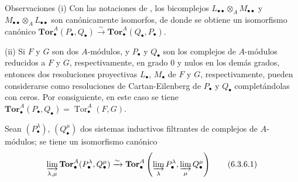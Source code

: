\begin{namedtheorem}[6.3.5]{Observaciones}
\label{III.6.3.5}
(i) Con las notaciones de , los bicomplejos
$L_{\bullet\bullet}\otimes_A M_{\bullet\bullet}$ y
$M_{\bullet\bullet}\otimes_A L_{\bullet\bullet}$ son canónicamente
isomorfos, de donde se obtiene un isomorfismo canónico
$\mathbf{Tor}_\bullet^A(P_\bullet,Q_\bullet)\xrightarrow{\sim}
\mathbf{Tor}_\bullet^A(Q_\bullet,P_\bullet)$.

(ii) Si $F$ y $G$ son dos $A$-módulos, y $P_\bullet$ y $Q_\bullet$ son los
complejos de $A$-módulos reducidos a $F$ y $G$, respectivamente, en grado 0 y
nulos en los demás grados, entonces dos resoluciones proyectivas $L_\bullet$,
$M_\bullet$ de $F$ y $G$, respectivamente, pueden considerarse como
resoluciones de Cartan-Eilenberg de $P_\bullet$ y $Q_\bullet$ completándolas
con ceros. Por consiguiente, en este caso se tiene
$\mathbf{Tor}_\bullet^A(P_\bullet,Q_\bullet)
=\operatorname{Tor}_\bullet^A(F,G)$.
\end{namedtheorem}

\begin{proposition}[6.3.6]
\label{III.6.3.6}
Sean $(P_\bullet^\lambda)$, $(Q_\bullet^\mu)$ dos sistemas inductivos
filtrantes de complejos de $A$-módulos; se tiene un isomorfismo canónico
\[
  \varinjlim_{\lambda,\mu}
  \mathbf{Tor}_\bullet^A(P_\bullet^\lambda,Q_\bullet^\mu)
  \xrightarrow{\sim}
  \mathbf{Tor}_\bullet^A
  \left(\varinjlim_\lambda P_\bullet^\lambda,
        \varinjlim_\mu Q_\bullet^\mu\right)
  \tag{6.3.6.1}\label{III.6.3.6.1.fr}
\]
\end{proposition}

